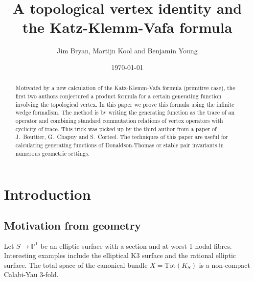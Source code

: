 \documentclass{amsart}
\title{A topological vertex identity and the Katz-Klemm-Vafa formula}
\author{Jim Bryan, Martijn Kool and Benjamin Young}
\date{\today}
\theoremstyle{definition}
\newcommand{\PP} {\mathbb{P}}
\begin{document}
\begin{abstract}
Motivated by a new calculation of the Katz-Klemm-Vafa formula (primitive case), the first two authors conjectured a product formula for a certain generating function involving the topological vertex. In this paper we prove this formula using the infinite wedge formalism. The method is by writing the generating function as the trace of an operator and combining standard commutation relations of vertex operators with cyclicity of trace. This trick was picked up by the third author from a paper of J.~Bouttier, G.~Chapuy and S.~Corteel. The techniques of this paper are useful for calculating generating functions of Donaldson-Thomas or stable pair invariants in numerous geometric settings.
\end{abstract}

\maketitle 





\section{Introduction}

\subsection{Motivation from geometry} Let $S \rightarrow \PP^1$ be an elliptic surface with a section and at worst 1-nodal fibres. Interesting examples include the elliptical K3 surface and the rational elliptic surface. The total space of the canonical bundle $X = \mathrm{Tot}(K_S)$ is a non-compact Calabi-Yau 3-fold. 
\end{document}

